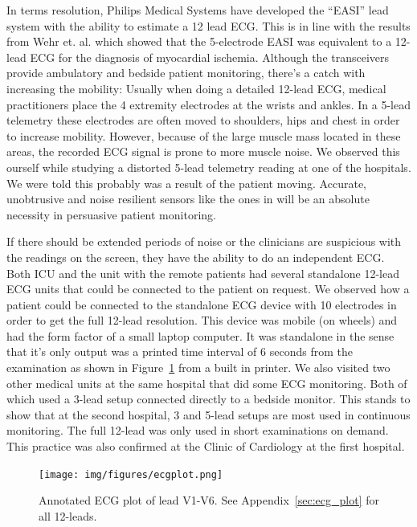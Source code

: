 In terms resolution, Philips Medical Systems have developed the ``EASI'' lead system with the ability to estimate a 12 lead ECG. This is in line with the results from \cite{Wehr:2006ht} Wehr et. al. which showed that the 5-electrode EASI was equivalent to a 12-lead ECG for the diagnosis of myocardial ischemia. Although the transceivers provide ambulatory and bedside patient monitoring, there's a catch with increasing the mobility: Usually when doing a detailed 12-lead ECG, medical practitioners place the 4 extremity electrodes at the wrists and ankles. In a 5-lead telemetry these electrodes are often moved to shoulders, hips and chest in order to increase mobility. However, because of the large muscle mass located in these areas, the recorded ECG signal is prone to more muscle noise. We observed this ourself while studying a distorted 5-lead telemetry reading at one of the hospitals. We were told this probably was a result of the patient moving. Accurate, unobtrusive and noise resilient sensors like the ones in \cite{ChulsungPark:2006tf, Anonymous:FtVb5yQr} will be an absolute necessity in persuasive patient monitoring. 

If there should be extended periods of noise or the clinicians are suspicious with the readings on the screen, they have the ability to do an independent ECG. Both ICU and the unit with the remote patients had several standalone 12-lead ECG units that could be connected to the patient on request. We observed how a patient could be connected to the standalone ECG device with 10 electrodes in order to get the full 12-lead resolution. This device was mobile (on wheels) and had the form factor of a small laptop computer. It was standalone in the sense that it's only output was a printed time interval of 6 seconds from the examination as shown in Figure~\ref{fig:pappa_ecg} from a built in printer.
We also visited two other medical units at the same hospital that did some ECG monitoring. Both of which used a 3-lead setup connected directly to a bedside monitor. This stands to show that at the second hospital, 3 and 5-lead setups are most used in continuous monitoring. The full 12-lead was only used in short examinations on demand. This practice was also confirmed at the Clinic of Cardiology at the first hospital.

\begin{figure}[H]
  \centering
  \texttt{[image: img/figures/ecgplot.png]}
  \caption{Annotated ECG plot of lead V1-V6. See Appendix~\ref{sec:ecg_plot} for all 12-leads.}
  \label{fig:pappa_ecg}
\end{figure}


